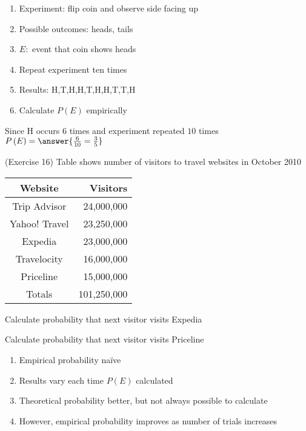 \documentclass{ximera}
\begin{document}
\begin{example}
\begin{question}
\begin{enumerate}
\item Experiment: flip coin and observe side facing up
\item Possible outcomes: heads, tails
\item $E:$ event that coin shows heads
\item Repeat experiment ten times
\item Results: H,T,H,H,T,H,H,T,T,H
\item Calculate $P\left(E\right)$ empirically
\end{enumerate}
\begin{solution} Since H occurs $6$ times
and experiment repeated $10$ times
$P\left(E\right)=\answer{\frac{6}{10}=\frac{3}{5}}$
\end{solution}
\end{question}
\end{example}

\begin{question}(Exercise 16)
Table shows number of visitors to travel websites in October 2010
\begin{center}\begin{tabular}{cr}
Website&Visitors\\\toprule
Trip Advisor&24,000,000\\
Yahoo! Travel&23,250,000\\
Expedia&23,000,000\\
Travelocity&16,000,000\\
Priceline&15,000,000\\\midrule
Totals&101,250,000
\end{tabular}\end{center}
\begin{parts}
\item Calculate probability that next visitor
visits Expedia
\begin{solution}\end{solution}
\item Calculate probability that next visitor
visits Priceline 
\begin{solution}\end{solution}
\end{parts}
\end{question}

\begin{remark}
\begin{enumerate}
\item Empirical probability na\"ive
\item Results vary each time $P\left(E\right)$ calculated
\item Theoretical probability better, but not always possible to calculate
\item However, empirical probability improves
as number of trials increases
\end{enumerate}
\end{remark}
\end{document}
